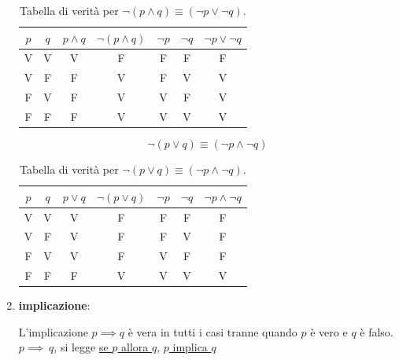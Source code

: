 \begin{enumerate}
                \begin{table}[h!]
                    \centering
                    \begin{tabular}{|c|c|c|c|c|c|c|}
                        \hline
                        $p$ & $q$ & $p \land q$ & $\neg (p \land q)$ & $\neg p$ & $\neg q$ & $\neg p \lor \neg q$ \\
                        \hline
                        V & V & V & F & F & F & F \\
                        V & F & F & V & F & V & V \\
                        F & V & F & V & V & F & V \\
                        F & F & F & V & V & V & V \\
                        \hline
                    \end{tabular}
                    \caption{Tabella di verità per \(\neg (p \land q) \equiv (\neg p \lor \neg q)\).}
                \end{table}
                
                \vspace{1em} 
                
                \[\neg (p \lor q) \equiv (\neg p \land \neg q)\]
                
                \begin{table}[h!]
                    \centering
                    \begin{tabular}{|c|c|c|c|c|c|c|}
                        \hline
                        $p$ & $q$ & $p \lor q$ & $\neg (p \lor q)$ & $\neg p$ & $\neg q$ & $\neg p \land \neg q$ \\
                        \hline
                        V & V & V & F & F & F & F \\
                        V & F & V & F & F & V & F \\
                        F & V & V & F & V & F & F \\
                        F & F & F & V & V & V & V \\
                        \hline
                    \end{tabular}
                    \caption{Tabella di verità per \(\neg (p \lor q) \equiv (\neg p \land \neg q)\).}
                \end{table}
    
    
            \item \textbf{implicazione}: 
                \begin{flushleft}
                     L'implicazione \( p \implies q \) è vera in tutti i casi tranne quando \( p \) è vero e \( q \) è falso.
                    \( p \implies\ q \), si legge \underline{se \( p \) allora \( q \)}, \underline{\( p \) implica \( q \)}
                \end{flushleft}
    

\end{enumerate}
